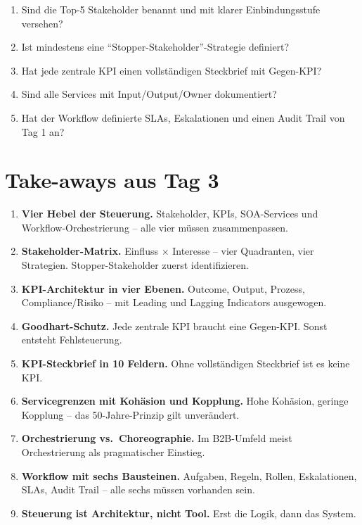 \documentclass[11pt,a4paper,oneside]{article}
\begin{document}
\begin{enumerate}
  \item Sind die Top-5 Stakeholder benannt und mit klarer Einbindungsstufe versehen?
  \item Ist mindestens eine ``Stopper-Stakeholder''-Strategie definiert?
  \item Hat jede zentrale KPI einen vollständigen Steckbrief mit Gegen-KPI?
  \item Sind alle Services mit Input/Output/Owner dokumentiert?
  \item Hat der Workflow definierte SLAs, Eskalationen und einen Audit Trail von Tag 1 an?
\end{enumerate}

\section{Take-aways aus Tag 3}

\begin{enumerate}
  \item \textbf{Vier Hebel der Steuerung.} Stakeholder, KPIs, SOA-Services und Workflow-Orchestrierung -- alle vier müssen zusammenpassen.
  \item \textbf{Stakeholder-Matrix.} Einfluss $\times$ Interesse -- vier Quadranten, vier Strategien. Stopper-Stakeholder zuerst identifizieren.
  \item \textbf{KPI-Architektur in vier Ebenen.} Outcome, Output, Prozess, Compliance/Risiko -- mit Leading und Lagging Indicators ausgewogen.
  \item \textbf{Goodhart-Schutz.} Jede zentrale KPI braucht eine Gegen-KPI. Sonst entsteht Fehlsteuerung.
  \item \textbf{KPI-Steckbrief in 10 Feldern.} Ohne vollständigen Steckbrief ist es keine KPI.
  \item \textbf{Servicegrenzen mit Kohäsion und Kopplung.} Hohe Kohäsion, geringe Kopplung -- das 50-Jahre-Prinzip gilt unverändert.
  \item \textbf{Orchestrierung vs.\ Choreographie.} Im B2B-Umfeld meist Orchestrierung als pragmatischer Einstieg.
  \item \textbf{Workflow mit sechs Bausteinen.} Aufgaben, Regeln, Rollen, Eskalationen, SLAs, Audit Trail -- alle sechs müssen vorhanden sein.
  \item \textbf{Steuerung ist Architektur, nicht Tool.} Erst die Logik, dann das System.
\end{enumerate}
\end{document}
